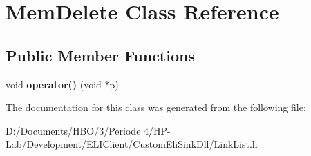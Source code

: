 \hypertarget{class_mem_delete}{}\section{Mem\+Delete Class Reference}
\label{class_mem_delete}
\subsection*{Public Member Functions}
\begin{DoxyCompactItemize}
\item 
\mbox{\label{class_mem_delete_a56216093ac15dd7623e4ced9198b674f}} 
void {\bfseries operator()} (void $\ast$p)
\end{DoxyCompactItemize}


The documentation for this class was generated from the following file\+:\begin{DoxyCompactItemize}
\item 
D\+:/\+Documents/\+H\+B\+O/3/\+Periode 4/\+H\+P-\/\+Lab/\+Development/\+E\+L\+I\+Client/\+Custom\+Eli\+Sink\+Dll/Link\+List.\+h\end{DoxyCompactItemize}
